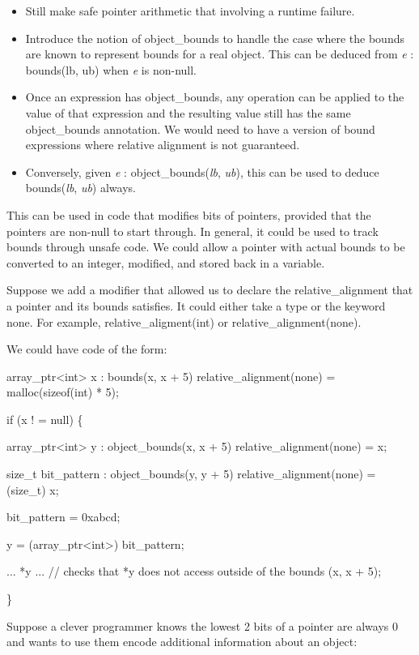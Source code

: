 \documentclass[]{article}
\begin{document}
\begin{itemize}
\item
  Still make safe pointer arithmetic that involving a runtime failure.
\item
  Introduce the notion of object\_bounds to handle the case where the
  bounds are known to represent bounds for a real object. This can be
  deduced from \emph{e} : bounds(lb, ub) when \emph{e} is non-null.
\item
  Once an expression has object\_bounds, any operation can be applied to
  the value of that expression and the resulting value still has the
  same object\_bounds annotation. We would need to have a version of
  bound expressions where relative alignment is not guaranteed.
\item
  Conversely, given \emph{e} : object\_bounds(\emph{lb}, \emph{ub}),
  this can be used to deduce bounds(\emph{lb}, \emph{ub}) always.
\end{itemize}

This can be used in code that modifies bits of pointers, provided that
the pointers are non-null to start through. In general, it could be used
to track bounds through unsafe code. We could allow a pointer with
actual bounds to be converted to an integer, modified, and stored back
in a variable.

Suppose we add a modifier that allowed us to declare the
relative\_alignment that a pointer and its bounds satisfies. It could
either take a type or the keyword none. For example,
relative\_aligment(int) or relative\_alignment(none).

We could have code of the form:

array\_ptr\textless{}int\textgreater{} x : bounds(x, x + 5)
relative\_alignment(none) = malloc(sizeof(int) * 5);

if (x ! = null) \{

array\_ptr\textless{}int\textgreater{} y : object\_bounds(x, x + 5)
relative\_alignment(none) = x;

size\_t bit\_pattern : object\_bounds(y, y + 5)
relative\_alignment(none) = (size\_t) x;

bit\_pattern \textbar{}= 0xabcd;

y = (array\_ptr\textless{}int\textgreater{}) bit\_pattern;

... *y ... // checks that *y does not access outside of the bounds (x, x
+ 5);

\}

Suppose a clever programmer knows the lowest 2 bits of a pointer are
always 0 and wants to use them encode additional information about an
object:
\end{document}
